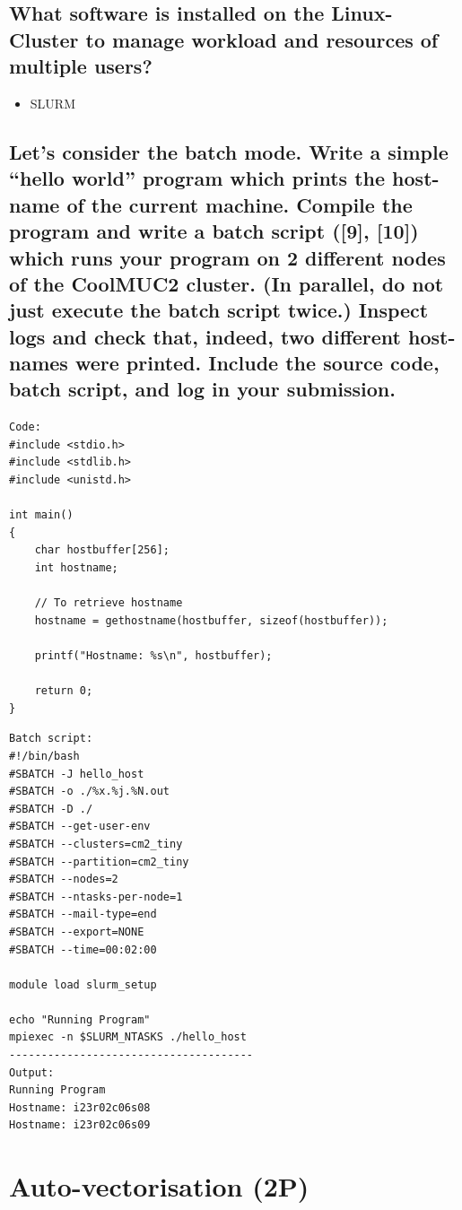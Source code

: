 \documentclass[article]{scrartcl}
\begin{document}
\subsection{What software is installed on the Linux-Cluster to manage workload and resources of
multiple users?}
\begin{itemize}
    \item SLURM
\end{itemize}

\subsection{Let’s consider the batch mode. Write a simple “hello world” program which prints the
host-name of the current machine.
Compile the program and write a batch script ([9], [10]) which runs your program
on 2 different nodes of the CoolMUC2 cluster. (In parallel, do not just execute the
batch script twice.) Inspect logs and check that, indeed, two different host-names were
printed.
Include the source code, batch script, and log in your submission.}
\begin{lstlisting}[frame=single]
Code:
#include <stdio.h>
#include <stdlib.h>
#include <unistd.h>

int main()
{
    char hostbuffer[256];
    int hostname;

    // To retrieve hostname
    hostname = gethostname(hostbuffer, sizeof(hostbuffer));

    printf("Hostname: %s\n", hostbuffer);

    return 0;
}
\end{lstlisting}
\begin{lstlisting}[frame=single]
Batch script:
#!/bin/bash
#SBATCH -J hello_host
#SBATCH -o ./%x.%j.%N.out
#SBATCH -D ./
#SBATCH --get-user-env
#SBATCH --clusters=cm2_tiny
#SBATCH --partition=cm2_tiny
#SBATCH --nodes=2
#SBATCH --ntasks-per-node=1
#SBATCH --mail-type=end
#SBATCH --export=NONE
#SBATCH --time=00:02:00
  
module load slurm_setup

echo "Running Program"
mpiexec -n $SLURM_NTASKS ./hello_host
--------------------------------------
Output:
Running Program
Hostname: i23r02c06s08
Hostname: i23r02c06s09

\end{lstlisting}

\section{Auto-vectorisation (2P)}
\end{document}
